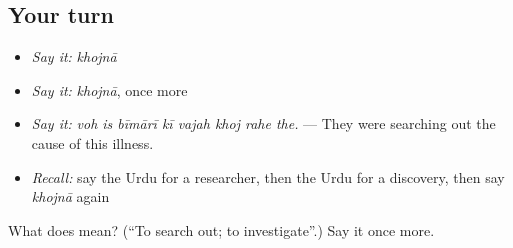 \subsection*{Your turn}
\begin{itemize}
\raggedright
  \item \emph{Say it:} \emph{khojnā}
  \item \emph{Say it:} \emph{khojnā}, once more
  \item \emph{Say it:} \emph{voh is bīmārī kī vajah khoj rahe the.} — They were searching out the cause of this illness.
  \item \emph{Recall:} say the Urdu for a researcher, then the Urdu for a discovery, then say \emph{khojnā} again
\end{itemize}

\begin{tcolorbox}[breakable,colback=teal!4,colframe=teal!35!black,title={Before you move on}]
What does  mean? (\textquotedblleft{}To search out; to investigate\textquotedblright{}.) Say it once more.
\end{tcolorbox}
